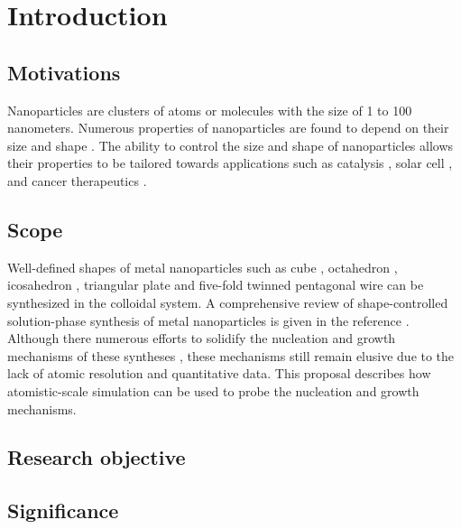 \section{Introduction}

\subsection{Motivations}

Nanoparticles are clusters of atoms or molecules with the size of 1 to 100 nanometers. Numerous properties of nanoparticles are found to depend on their size \cite{Roduner_2006} and shape \cite{Xia_2008}. The ability to control the size and shape of nanoparticles allows their properties to be tailored towards applications such as catalysis \cite{astruc2008nanoparticles,Astruc_2006}, solar cell \cite{Atwater_2010}, and cancer therapeutics \cite{Jain_2010,Kim_2010}.

\subsection{Scope}

Well-defined shapes of metal nanoparticles such as cube \cite{Im_2005}, octahedron \cite{Xia_2012}, icosahedron \cite{Xiong_2007}, triangular plate \cite{Lofton_2005} and five-fold twinned pentagonal wire \cite{Tsuji_2008} can be synthesized in the colloidal system. A comprehensive review of shape-controlled solution-phase synthesis of metal nanoparticles is given in the reference \cite{Xia_2008}. Although there numerous efforts to solidify the nucleation and growth mechanisms of these syntheses \cite{Lofton_2005,Mariscal_2012,Park_2013,Viswanath_2009,Liao_2014,Chang_2011,Murph_2015}, these mechanisms still remain elusive due to the lack of atomic resolution and quantitative data. This proposal describes how atomistic-scale simulation can be used to probe the nucleation and growth mechanisms.

\subsection{Research objective}

\subsection{Significance}